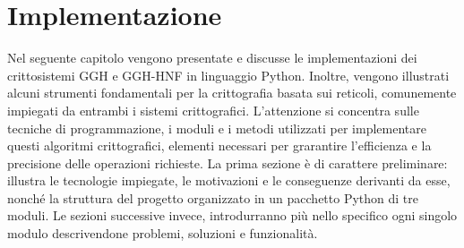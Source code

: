 \chapter{Implementazione}
Nel seguente capitolo vengono presentate e discusse le implementazioni dei crittosistemi 
GGH e GGH-HNF in linguaggio Python. Inoltre, vengono illustrati alcuni strumenti fondamentali 
per la crittografia basata sui reticoli, comunemente impiegati da entrambi i sistemi crittografici.
L'attenzione si concentra sulle tecniche di programmazione, i moduli e i metodi utilizzati
per implementare questi algoritmi crittografici, elementi necessari per
grarantire l'efficienza e la precisione delle operazioni richieste. 
La prima sezione è di carattere preliminare: 
illustra le tecnologie impiegate, le motivazioni e le conseguenze derivanti da esse, 
nonché la struttura del progetto organizzato in un pacchetto Python di tre moduli. 
Le sezioni successive invece, introdurranno più nello specifico ogni singolo modulo descrivendone
problemi, soluzioni e funzionalità.
\label{cap:Implementazione}
%
%

%
%

%
%

%
%


